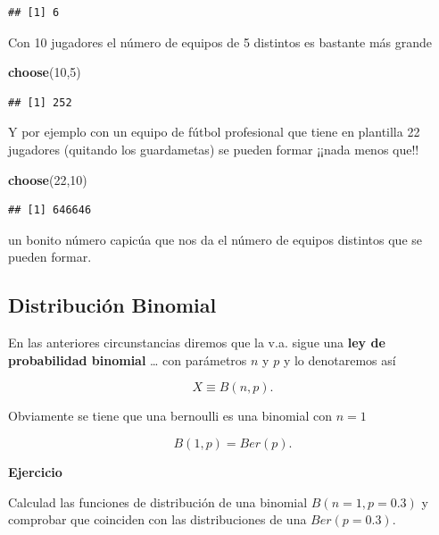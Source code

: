 \documentclass[]{book}
\newenvironment{Shaded}{\begin{snugshade}}{\end{snugshade}}
\newcommand{\DecValTok}[1]{\textcolor[rgb]{0.00,0.00,0.81}{#1}}
\newcommand{\KeywordTok}[1]{\textcolor[rgb]{0.13,0.29,0.53}{\textbf{#1}}}
\newcommand{\NormalTok}[1]{#1}
\begin{document}
\begin{verbatim}
## [1] 6
\end{verbatim}

Con 10 jugadores el número de equipos de 5 distintos es bastante más grande

\begin{Shaded}
\begin{Highlighting}[]
\KeywordTok{choose}\NormalTok{(}\DecValTok{10}\NormalTok{,}\DecValTok{5}\NormalTok{)}
\end{Highlighting}
\end{Shaded}

\begin{verbatim}
## [1] 252
\end{verbatim}

Y por ejemplo con un equipo de fútbol profesional que tiene en plantilla 22 jugadores (quitando los guardametas) se pueden formar ¡¡nada menos que!!

\begin{Shaded}
\begin{Highlighting}[]
\KeywordTok{choose}\NormalTok{(}\DecValTok{22}\NormalTok{,}\DecValTok{10}\NormalTok{)}
\end{Highlighting}
\end{Shaded}

\begin{verbatim}
## [1] 646646
\end{verbatim}

un bonito número capicúa que nos da el número de equipos distintos que se pueden formar.

\hypertarget{distribuciuxf3n-binomial-1}{%
\subsection{Distribución Binomial}\label{distribuciuxf3n-binomial-1}}

En las anteriores circunstancias diremos que la v.a. sigue una \textbf{ley de probabilidad binomial} \ldots{} con parámetros \(n\) y \(p\) y lo denotaremos así

\[X\equiv B(n,p).\]

Obviamente se tiene que una bernoulli es una binomial con \(n=1\)

\[B(1,p)=Ber(p).\]

\textbf{Ejercicio}

Calculad las funciones de distribución de una binomial \(B(n=1,p=0.3)\) y comprobar que coinciden con las distribuciones de una \(Ber(p=0.3)\).
\end{document}
